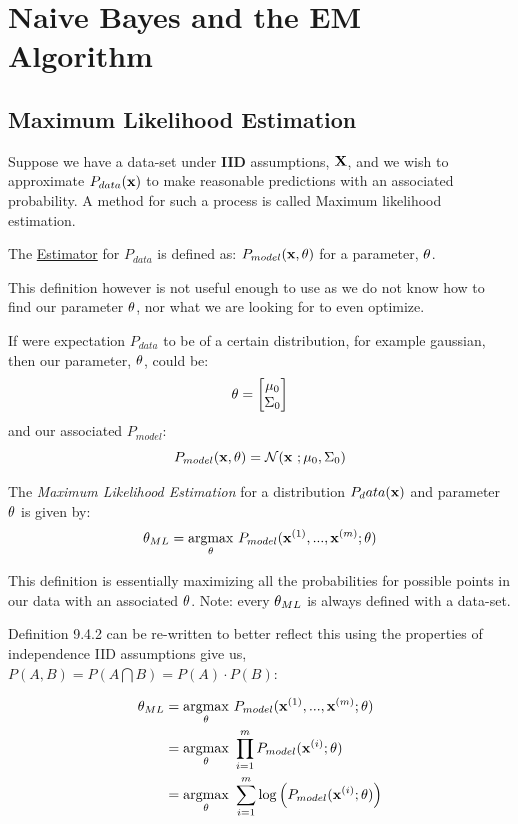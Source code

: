 \chapter{Naive Bayes and the EM Algorithm}
\label{Maximum Likelihood estimation}

\section{Maximum Likelihood Estimation}

Suppose we have a data-set under \textbf{IID} assumptions, $\MX$, and we wish to approximate $P_{data}(\vx)$ to make reasonable predictions with an associated probability. A method for such a process is called Maximum likelihood estimation. \\

\begin{definition}
    The \underline{Estimator} for $P_{data}$ is defined as: $P_{model}(\vx,\vtheta)$ for a parameter, $\vtheta$. 
\end{definition}

This definition however is not useful enough to use as we do not know how to find our parameter $\vtheta$, nor what we are looking for to even optimize. \\

\begin{example}
    If were expectation $P_{data}$ to be of a certain distribution, for example gaussian, then our parameter, $\vtheta$, could be: 
    $$\vtheta = \begin{bmatrix} \mu_0 \\ \Sigma_0 \end{bmatrix}$$
    and our associated $P_{model}$:
    $$P_{model}(\vx,\vtheta) = \Normal(\vx\ ;\mu_0, \Sigma_0)$$
\end{example}

\begin{definition}
    The \textit{Maximum Likelihood Estimation} for a distribution $P_data(\vx)$ and parameter $\vtheta$ is given by:
    $$\vtheta_{ML} = \underset{\vtheta}{\argmax}\ P_{model}(\vx^{(1)},...,\vx^{(m)};\vtheta)$$
\end{definition}
\newpage
This definition is essentially maximizing all the probabilities for possible points in our data with an associated $\vtheta$. Note: every $\vtheta_{ML}$ is always defined with a data-set. 
\begin{example}
    
    Definition 9.4.2 can be re-written to better reflect this using the properties of independence IID assumptions give us, $P(A,B) = P(A\bigcap B) = P(A)\cdot P(B)$: 

    \begin{align*}
       \vtheta_{ML} &= \underset{\vtheta}{\argmax}\ P_{model}(\vx^{(1)},...,\vx^{(m)};\vtheta) \\
      & = \underset{\vtheta}{\argmax}\ \prod_{i=1}^m P_{model}(\vx^{(i)};\vtheta) \\
      & = \underset{\vtheta}{\argmax}\ \sum_{i=1}^m \log\left(P_{model}(\vx^{(i)};\vtheta)\right)
    \end{align*}
\end{example}

